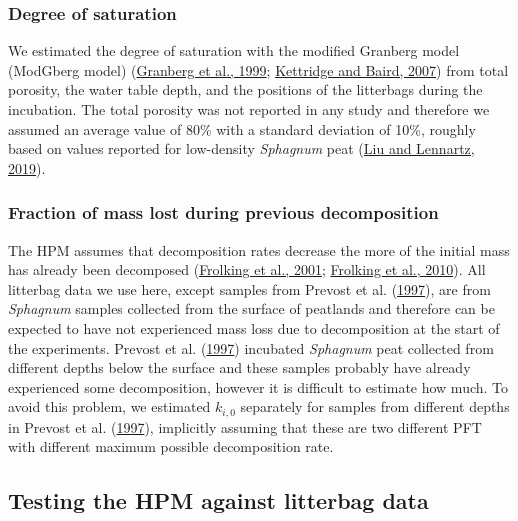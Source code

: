 \documentclass[
  12pt,
]{article}
\begin{document}
\hypertarget{sdm-003-methods-5}{%
\subsubsection{Degree of saturation}\label{sdm-003-methods-5}}

We estimated the degree of saturation with the modified Granberg model (ModGberg model) (\protect\hyperlink{ref-Granberg.1999}{Granberg et al., 1999}; \protect\hyperlink{ref-Kettridge.2007}{Kettridge and Baird, 2007}) from total porosity, the water table depth, and the positions of the litterbags during the incubation. The total porosity was not reported in any study and therefore we assumed an average value of 80\% with a standard deviation of 10\%, roughly based on values reported for low-density \emph{Sphagnum} peat (\protect\hyperlink{ref-Liu.2019}{Liu and Lennartz, 2019}).

\hypertarget{sdm-003-methods-6}{%
\subsubsection{Fraction of mass lost during previous decomposition}\label{sdm-003-methods-6}}

The HPM assumes that decomposition rates decrease the more of the initial mass has already been decomposed (\protect\hyperlink{ref-Frolking.2001}{Frolking et al., 2001}; \protect\hyperlink{ref-Frolking.2010}{Frolking et al., 2010}). All litterbag data we use here, except samples from Prevost et al. (\protect\hyperlink{ref-Prevost.1997}{1997}), are from \emph{Sphagnum} samples collected from the surface of peatlands and therefore can be expected to have not experienced mass loss due to decomposition at the start of the experiments. Prevost et al. (\protect\hyperlink{ref-Prevost.1997}{1997}) incubated \emph{Sphagnum} peat collected from different depths below the surface and these samples probably have already experienced some decomposition, however it is difficult to estimate how much. To avoid this problem, we estimated \(k_{i,0}\) separately for samples from different depths in Prevost et al. (\protect\hyperlink{ref-Prevost.1997}{1997}), implicitly assuming that these are two different PFT with different maximum possible decomposition rate.

\hypertarget{sdm-003-methods-7}{%
\subsection{Testing the HPM against litterbag data}\label{sdm-003-methods-7}}
\end{document}
